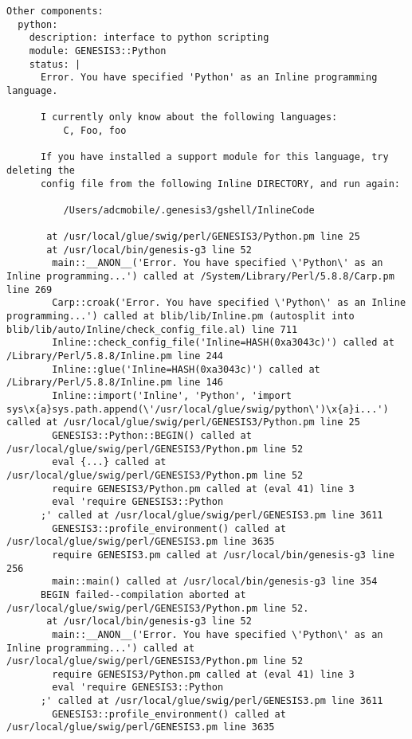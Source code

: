 \documentclass[12pt]{article}
\begin{document}
\begin{verbatim}
Other components:
  python:
    description: interface to python scripting
    module: GENESIS3::Python
    status: |
      Error. You have specified 'Python' as an Inline programming language.
      
      I currently only know about the following languages:
          C, Foo, foo
      
      If you have installed a support module for this language, try deleting the
      config file from the following Inline DIRECTORY, and run again:
      
          /Users/adcmobile/.genesis3/gshell/InlineCode
      
       at /usr/local/glue/swig/perl/GENESIS3/Python.pm line 25
       at /usr/local/bin/genesis-g3 line 52
      	main::__ANON__('Error. You have specified \'Python\' as an Inline programming...') called at /System/Library/Perl/5.8.8/Carp.pm line 269
      	Carp::croak('Error. You have specified \'Python\' as an Inline programming...') called at blib/lib/Inline.pm (autosplit into blib/lib/auto/Inline/check_config_file.al) line 711
      	Inline::check_config_file('Inline=HASH(0xa3043c)') called at /Library/Perl/5.8.8/Inline.pm line 244
      	Inline::glue('Inline=HASH(0xa3043c)') called at /Library/Perl/5.8.8/Inline.pm line 146
      	Inline::import('Inline', 'Python', 'import sys\x{a}sys.path.append(\'/usr/local/glue/swig/python\')\x{a}i...') called at /usr/local/glue/swig/perl/GENESIS3/Python.pm line 25
      	GENESIS3::Python::BEGIN() called at /usr/local/glue/swig/perl/GENESIS3/Python.pm line 52
      	eval {...} called at /usr/local/glue/swig/perl/GENESIS3/Python.pm line 52
      	require GENESIS3/Python.pm called at (eval 41) line 3
      	eval 'require GENESIS3::Python
      ;' called at /usr/local/glue/swig/perl/GENESIS3.pm line 3611
      	GENESIS3::profile_environment() called at /usr/local/glue/swig/perl/GENESIS3.pm line 3635
      	require GENESIS3.pm called at /usr/local/bin/genesis-g3 line 256
      	main::main() called at /usr/local/bin/genesis-g3 line 354
      BEGIN failed--compilation aborted at /usr/local/glue/swig/perl/GENESIS3/Python.pm line 52.
       at /usr/local/bin/genesis-g3 line 52
      	main::__ANON__('Error. You have specified \'Python\' as an Inline programming...') called at /usr/local/glue/swig/perl/GENESIS3/Python.pm line 52
      	require GENESIS3/Python.pm called at (eval 41) line 3
      	eval 'require GENESIS3::Python
      ;' called at /usr/local/glue/swig/perl/GENESIS3.pm line 3611
      	GENESIS3::profile_environment() called at /usr/local/glue/swig/perl/GENESIS3.pm line 3635

\end{verbatim}
\end{document}
